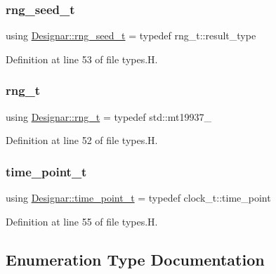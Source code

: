 \subsubsection{\texorpdfstring{rng\+\_\+seed\+\_\+t}{rng\_seed\_t}}
{\footnotesize\ttfamily using \hyperlink{namespace_designar_ad621b5646d45288c5d6a1e1dfe7531a8}{Designar\+::rng\+\_\+seed\+\_\+t} = typedef rng\+\_\+t\+::result\+\_\+type}



Definition at line 53 of file types.\+H.

\mbox{\label{namespace_designar_a9ca84e2ff5daa62ebc4dab52f3a6c855}} 
\subsubsection{\texorpdfstring{rng\+\_\+t}{rng\_t}}
{\footnotesize\ttfamily using \hyperlink{namespace_designar_a9ca84e2ff5daa62ebc4dab52f3a6c855}{Designar\+::rng\+\_\+t} = typedef std\+::mt19937\+\_}



Definition at line 52 of file types.\+H.

\mbox{\label{namespace_designar_a0edbd598eadb672df2c70e5af4dfccee}} 
\subsubsection{\texorpdfstring{time\+\_\+point\+\_\+t}{time\_point\_t}}
{\footnotesize\ttfamily using \hyperlink{namespace_designar_a0edbd598eadb672df2c70e5af4dfccee}{Designar\+::time\+\_\+point\+\_\+t} = typedef clock\+\_\+t\+::time\+\_\+point}



Definition at line 55 of file types.\+H.



\subsection{Enumeration Type Documentation}
\mbox{\label{namespace_designar_a679bc99fd69a3601faa5d6d47f865106}} 
